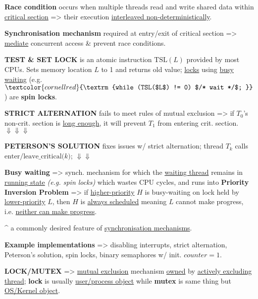 
\textbf{Race condition} occurs when multiple threads read and
write shared data within \ul{critical section} =>
their execution \ul{interleaved non-deterministically}.


\hSep

\textbf{Synchronisation mechanism} required at entry/exit of
critical section => \ul{mediate} concurrent access \& prevent race conditions.


\textbf{TEST \& SET LOCK} is an atomic instruction $\mathrm{TSL}(L)$
provided by most CPUs. Sets memory location $L$ to 1 and returns old value;
\ul{locks} using \ul{busy waiting} (e.g. \(\textcolor{cornellred}{\textrm{while (TSL($L$) != 0) $/* wait */$; }}\))
are \textbf{spin locks}.


\textbf{STRICT ALTERNATION} fails to meet rules of mutual exclusion =>
if $T_0$'s non-crit. section is \ul{long enough}, it will prevent $T_1$
from entering crit. section. $\Downarrow \Downarrow \Downarrow$

\textbf{PETERSON'S SOLUTION} fixes issues w/ strict alternation; thread $T_k$ calls
\(\textrm{enter/leave\_critical($k$)}\); $\Downarrow \Downarrow$

\hSep

\textbf{Busy waiting} => synch. mechanism for which the
\ul{waiting thread} remains in \ul{running state} \textit{(e.g. spin locks)} which wastes CPU cycles,
and runs into \textbf{Priority Inversion Problem} => if \ul{higher-priority} $H$ is busy-waiting
on lock held by \ul{lower-priority} $L$, then $H$ is \ul{always scheduled} meaning $L$
cannot make progress, i.e. \ul{neither can make progress}.

\^{} a commonly desired feature of \ul{synchronisation mechanisms}.

\textbf{Example implementations} => disabling interrupts, strict alternation, Peterson's solution,
spin locks, binary semaphores w/ init. $counter{=}1$.

\hSep

\textbf{LOCK/MUTEX} => \ul{mutual exclusion} mechanism \ul{owned} by \ul{actively excluding thread};
\textbf{lock} is usually \ul{user/process object} while
\textbf{mutex} is same thing but \ul{OS/Kernel object}.

